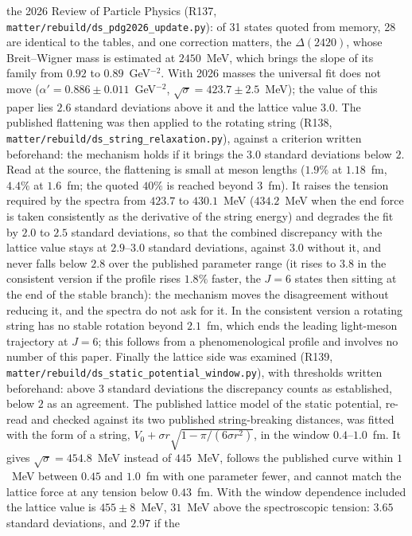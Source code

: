 \documentclass[11pt,a4paper]{article}
\theoremstyle{plain}
\theoremstyle{remark}
\begin{document}
the 2026 Review of Particle Physics (R137, \texttt{matter/rebuild/ds\_pdg2026\_update.py}): of 31 states quoted from
memory, 28 are identical to the tables, and one correction matters, the $\Delta(2420)$, whose Breit--Wigner mass is
estimated at $2450$~MeV, which brings the slope of its family from $0.92$ to $0.89$~GeV$^{-2}$. With 2026 masses the
universal fit does not move ($\alpha'=0.886\pm0.011$~GeV$^{-2}$, $\sqrt{\sigma}=423.7\pm2.5$~MeV); the value of this
paper lies $2.6$ standard deviations above it and the lattice value $3.0$. The published flattening was then applied
to the rotating string (R138, \texttt{matter/rebuild/ds\_string\_relaxation.py}), against a criterion written
beforehand: the mechanism holds if it brings the $3.0$ standard deviations below $2$. Read at the source, the
flattening is small at meson lengths ($1.9\%$ at $1.18$~fm, $4.4\%$ at $1.6$~fm; the quoted $40\%$ is reached beyond
$3$~fm). It raises the tension required by the spectra from $423.7$ to $430.1$~MeV ($434.2$~MeV when the end force is
taken consistently as the derivative of the string energy) and degrades the fit by $2.0$ to $2.5$ standard deviations,
so that the combined discrepancy with the lattice value stays at $2.9$--$3.0$ standard deviations, against $3.0$
without it, and never falls below $2.8$ over the published parameter range (it rises to $3.8$ in the consistent
version if the profile rises $1.8\%$ faster, the $J=6$ states then sitting at the end of the stable branch): the
mechanism moves the disagreement without reducing it, and the spectra do not ask for it. In the consistent version a rotating string has no stable
rotation beyond $2.1$~fm, which ends the leading light-meson trajectory at $J=6$; this follows from a
phenomenological profile and involves no number of this paper. Finally the lattice side was examined (R139,
\texttt{matter/rebuild/ds\_static\_potential\_window.py}), with thresholds written beforehand: above $3$ standard
deviations the discrepancy counts as established, below $2$ as an agreement. The published lattice model of the static
potential, re-read and checked against its two published string-breaking distances, was fitted with the form of a
string, $V_0+\sigma r\sqrt{1-\pi/(6\sigma r^2)}$, in the window $0.4$--$1.0$~fm. It gives $\sqrt{\sigma}=454.8$~MeV
instead of $445$~MeV, follows the published curve within $1$~MeV between $0.45$ and $1.0$~fm with one parameter fewer,
and cannot match the lattice force at any tension below $0.43$~fm. With the window dependence included the lattice
value is $455\pm8$~MeV, $31$~MeV above the spectroscopic tension: $3.65$ standard deviations, and $2.97$ if the
\end{document}
